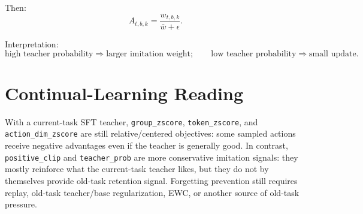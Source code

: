 \documentclass[10pt]{article}
\newcommand{\code}[1]{\texttt{#1}}
\newcommand{\Adv}{A}
\begin{document}
Then:
\[
  \Adv_{t,b,k}
  =
  \frac{w_{t,b,k}}{\bar{w}+\epsilon}.
\]

Interpretation:
\[
  \text{high teacher probability}
  \Rightarrow
  \text{larger imitation weight};
  \qquad
  \text{low teacher probability}
  \Rightarrow
  \text{small update}.
\]

\section*{Continual-Learning Reading}

With a current-task SFT teacher, \code{group\_zscore}, \code{token\_zscore}, and
\code{action\_dim\_zscore} are still relative/centered objectives: some sampled
actions receive negative advantages even if the teacher is generally good. In contrast,
\code{positive\_clip} and \code{teacher\_prob} are more conservative imitation signals:
they mostly reinforce what the current-task teacher likes, but they do not by themselves
provide old-task retention signal. Forgetting prevention still requires replay,
old-task teacher/base regularization, EWC, or another source of old-task pressure.
\end{document}
